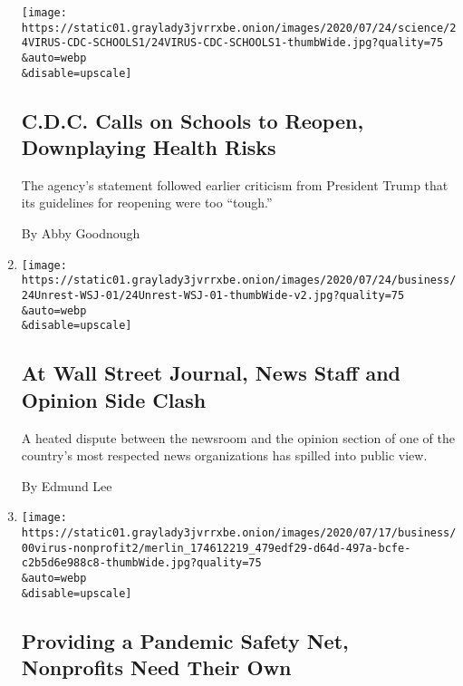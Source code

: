 \begin{enumerate}
  \texttt{[image: https://static01.graylady3jvrrxbe.onion/images/2020/07/24/science/24VIRUS-CDC-SCHOOLS1/24VIRUS-CDC-SCHOOLS1-thumbWide.jpg?quality=75\\\&auto=webp\\\&disable=upscale]}

  \hypertarget{cdc-calls-on-schools-to-reopen-downplaying-health-risks}{%
  \subsection{C.D.C. Calls on Schools to Reopen, Downplaying Health
  Risks}\label{cdc-calls-on-schools-to-reopen-downplaying-health-risks}}

  The agency's statement followed earlier criticism from President Trump
  that its guidelines for reopening were too ``tough.''

  By Abby Goodnough
\item
  \href{/2020/07/24/business/media/wall-street-journal-news-opinion-clash-letter.html}{}

  \texttt{[image: https://static01.graylady3jvrrxbe.onion/images/2020/07/24/business/24Unrest-WSJ-01/24Unrest-WSJ-01-thumbWide-v2.jpg?quality=75\\\&auto=webp\\\&disable=upscale]}

  \hypertarget{at-wall-street-journal-news-staff-and-opinion-side-clash}{%
  \subsection{At Wall Street Journal, News Staff and Opinion Side
  Clash}\label{at-wall-street-journal-news-staff-and-opinion-side-clash}}

  A heated dispute between the newsroom and the opinion section of one
  of the country's most respected news organizations has spilled into
  public view.

  By Edmund Lee
\item
  \href{/2020/07/24/business/economy/nonprofits-coronavirus-economy.html}{}

  \texttt{[image: https://static01.graylady3jvrrxbe.onion/images/2020/07/17/business/00virus-nonprofit2/merlin\_174612219\_479edf29-d64d-497a-bcfe-c2b5d6e988c8-thumbWide.jpg?quality=75\\\&auto=webp\\\&disable=upscale]}

  \hypertarget{providing-a-pandemic-safety-net-nonprofits-need-their-own}{%
  \subsection{Providing a Pandemic Safety Net, Nonprofits Need Their
  Own}\label{providing-a-pandemic-safety-net-nonprofits-need-their-own}}


\end{enumerate}
